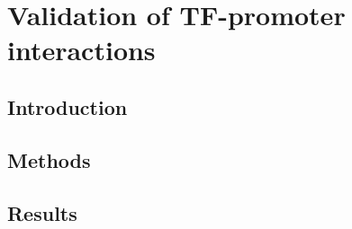 \documentclass[../main.tex]{subfiles}
\begin{document}
\chapter{Validation of TF-promoter interactions}
\label{chapter3}
\section{Introduction}
\label{chapter3:introduction}
\section{Methods}
\label{chapter3:methods}
\section{Results}
\label{chapter3:results}
\end{document}
